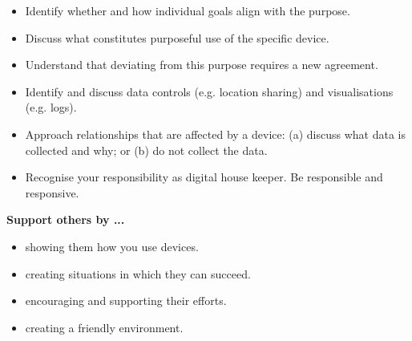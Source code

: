 \documentclass[10pt,nocombine]{leaflet}
\begin{document}
\begin{onehalfspacing}
\begin{itemize}[label=~,labelsep=10pt,leftmargin=40pt]
    \item \large Identify whether and how individual goals align with the purpose. 
    \item \large Discuss what constitutes purposeful use of the specific device.
    \item \large Understand that deviating from this purpose requires a new agreement.\vspace{1ex}
\end{itemize}
\begin{itemize}[label=\Large\protect{},labelsep=10pt,leftmargin=40pt]
    \item \large Identify and discuss data controls (e.g. location sharing) and visualisations (e.g. logs). 
\end{itemize}
\begin{itemize}[label=~,labelsep=10pt,leftmargin=40pt]
    \item \large Approach relationships that are affected by a device: (a) discuss what data is collected and why; or (b) do not collect the data.
    \item \large Recognise your responsibility as digital house keeper. Be responsible and responsive.\vspace{1ex}
\end{itemize}
\end{onehalfspacing}
\vfill
\clearpage
\phantom{a}\vfill
\parbox{\linewidth}{
{\Large\bfseries\color{cobalt} Support others by ...}
\begin{itemize}
  \large\sffamily\color{black} 
    \item showing them how you use devices.
    \item creating situations in which they can succeed.
\item encouraging and supporting their efforts.
\item creating a friendly environment.
\end{itemize}
}
\end{document}
